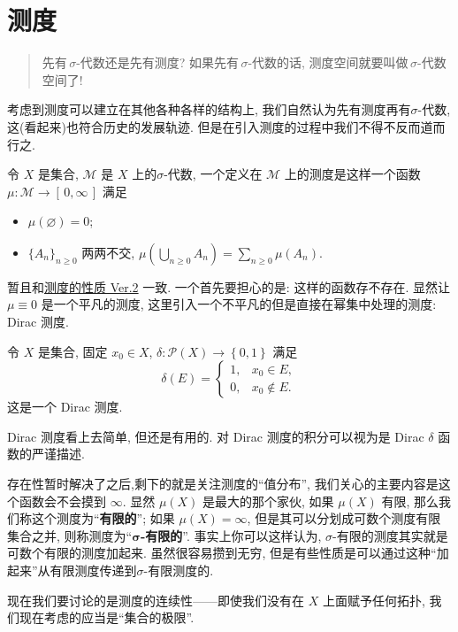 \section{测\kern\ccwd 度}
\begin{quote}
    先有\,$\sigma $-代数还是先有测度? 如果先有\,$\sigma $-代数的话, 测度空间就要叫做\,$\sigma $-代数空间了!
\end{quote}
考虑到测度可以建立在其他各种各样的结构上, 我们自然认为先有测度再有\;$\sigma $-代数, 这(看起来)也符合历史的发展轨迹. 但是在引入测度的过程中我们不得不反而道而行之.

\begin{defi}
    令 $X$ 是集合, $\mathcal M$ 是 $X$ 上的$\sigma $-代数, 一个定义在 $\mathcal M$ 上的测度是这样一个函数 $\mu :\mathcal M\to [\,0,\infty\,]$ 满足
    \begin{itemize}
        \item $\mu (\varnothing)=0$;
        \item $\{A_n\}_{n\geqslant 0}$ 两两不交, $\mu (\bigcup_{n\geqslant 0} A_n) = \sum_{n\geqslant 0} \mu (A_n)$.
    \end{itemize}
\end{defi}
暂且和\hyperref[测度的性质]{测度的性质 Ver.2} 一致. 一个首先要担心的是: 这样的函数存不存在. 显然让 $\mu\equiv 0$ 是一个平凡的测度, 这里引入一个不平凡的但是直接在幂集中处理的测度: Dirac 测度.
\begin{defi}[Dirac 测度]
    令 $X$ 是集合, 固定 $x_0\in X$, $\delta:\mathcal P(X)\to \left\{ 0,1 \right\} $ 满足
    \[
        \delta (E)=\begin{cases}
            1, & x_0\in E,    \\
            0, & x_0\notin E.
        \end{cases}
    \]
    这是一个 Dirac 测度.
\end{defi}
Dirac 测度看上去简单, 但还是有用的. 对 Dirac 测度的积分可以视为是 Dirac $\delta $ 函数的严谨描述.

存在性暂时解决了之后,剩下的就是关注测度的``值分布'', 我们关心的主要内容是这个函数会不会摸到 $\infty$. 显然 $\mu (X)$ 是最大的那个家伙, 如果 $\mu (X)$ 有限, 那么我们称这个测度为``\textbf{有限的}''; 如果 $\mu (X)=\infty$, 但是其可以分划成可数个\enote 测度有限集合之并, 则称测度为``\textbf{$\boldsymbol\sigma $-有限的}''. 事实上你可以这样认为, $\sigma $-有限的测度其实就是可数个有限的测度加起来. 虽然很容易攒到无穷, 但是有些性质是可以通过这种``加起来''从有限测度传递到\;$\sigma $-有限测度的\enote\enote.


现在我们要讨论的是测度的连续性------即使我们没有在 $X$ 上面赋予任何拓扑, 我们现在考虑的应当是``集合的极限''.

